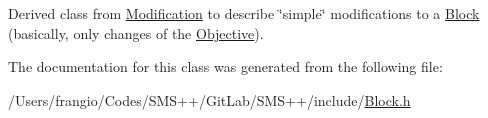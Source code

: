 Derived class from \mbox{\hyperlink{class_s_m_spp__di__unipi__it_1_1_modification}{Modification}} to describe \char`\"{}simple\char`\"{} modifications to a \mbox{\hyperlink{class_s_m_spp__di__unipi__it_1_1_block}{Block}} (basically, only changes of the \mbox{\hyperlink{class_s_m_spp__di__unipi__it_1_1_objective}{Objective}}). 

The documentation for this class was generated from the following file\+:\begin{DoxyCompactItemize}
\item 
/\+Users/frangio/\+Codes/\+S\+M\+S++/\+Git\+Lab/\+S\+M\+S++/include/\mbox{\hyperlink{_block_8h}{Block.\+h}}\end{DoxyCompactItemize}
